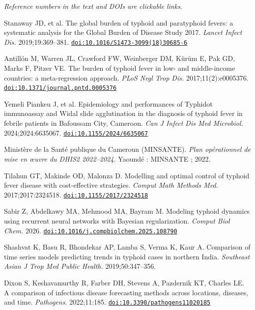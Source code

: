 \documentclass[11pt]{article}
\begin{document}
\noindent\textit{Reference numbers in the text and DOIs are clickable links.}
\begin{enumerate}[label={[\arabic*]},leftmargin=2.2em,itemsep=0.5pt]
\item\hypertarget{ref1}{}Stanaway JD, et al. The global burden of typhoid and paratyphoid fevers: a systematic analysis for the Global Burden of Disease Study 2017. \textit{Lancet Infect Dis.} 2019;19:369--381. \href{https://doi.org/10.1016/S1473-3099(18)30685-6}{\nolinkurl{doi:10.1016/S1473-3099(18)30685-6}}
\item\hypertarget{ref2}{}Antillón M, Warren JL, Crawford FW, Weinberger DM, Kürüm E, Pak GD, Marks F, Pitzer VE. The burden of typhoid fever in low- and middle-income countries: a meta-regression approach. \textit{PLoS Negl Trop Dis.} 2017;11(2):e0005376. \href{https://doi.org/10.1371/journal.pntd.0005376}{\nolinkurl{doi:10.1371/journal.pntd.0005376}}
\item\hypertarget{ref3}{}Yemeli Piankeu J, et al. Epidemiology and performances of Typhidot immunoassay and Widal slide agglutination in the diagnosis of typhoid fever in febrile patients in Bafoussam City, Cameroon. \textit{Can J Infect Dis Med Microbiol.} 2024;2024:6635067. \href{https://doi.org/10.1155/2024/6635067}{\nolinkurl{doi:10.1155/2024/6635067}}
\item\hypertarget{ref4}{}Ministère de la Santé publique du Cameroun (MINSANTE). \textit{Plan opérationnel de mise en œuvre du DHIS2 2022--2024.} Yaoundé : MINSANTE ; 2022.
\item\hypertarget{ref5}{}Tilahun GT, Makinde OD, Malonza D. Modelling and optimal control of typhoid fever disease with cost-effective strategies. \textit{Comput Math Methods Med.} 2017;2017:2324518. \href{https://doi.org/10.1155/2017/2324518}{\nolinkurl{doi:10.1155/2017/2324518}}
\item\hypertarget{ref6}{}Sabir Z, Abdelkawy MA, Mehmood MA, Bayram M. Modeling typhoid dynamics using recurrent neural networks with Bayesian regularization. \textit{Comput Biol Chem.} 2026. \href{https://doi.org/10.1016/j.compbiolchem.2025.108790}{\nolinkurl{doi:10.1016/j.compbiolchem.2025.108790}}
\item\hypertarget{ref7}{}Shashvat K, Basu R, Bhondekar AP, Lamba S, Verma K, Kaur A. Comparison of time series models predicting trends in typhoid cases in northern India. \textit{Southeast Asian J Trop Med Public Health.} 2019;50:347--356.
\item\hypertarget{ref8}{}Dixon S, Keshavamurthy R, Farber DH, Stevens A, Pazdernik KT, Charles LE. A comparison of infectious disease forecasting methods across locations, diseases, and time. \textit{Pathogens.} 2022;11:185. \href{https://doi.org/10.3390/pathogens11020185}{\nolinkurl{doi:10.3390/pathogens11020185}}

\end{enumerate}
\end{document}
